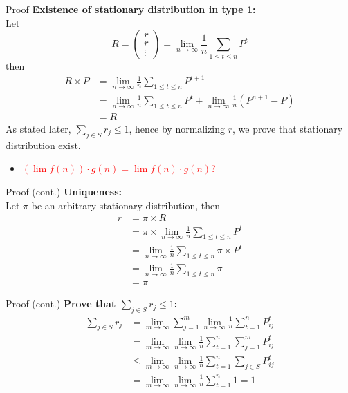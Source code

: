 \documentclass{beamer}
\begin{document}
\begin{frame}[shrink]{Proof}
	\textbf{Existence of stationary distribution in type 1:} \\
	Let 
	\[
	R = 
	\begin{pmatrix}
		r \\
		r \\
		\vdots
	\end{pmatrix} 
	= \lim_{n\to\infty} \frac{1}{n} \sum_{1 \leq t \leq n} P^t
	\]
	then
	\begin{align*}
		R \times P &= \lim_{n\to\infty} \frac{1}{n} \sum_{1 \leq t \leq n} P^{t+1} \\
		&= \lim_{n\to\infty} \frac{1}{n} \sum_{1 \leq t \leq n} P^t + \lim_{n\to\infty} \frac{1}{n}(P^{n+1} - P) \\
		&= R
	\end{align*}
	As stated later, $\sum_{j \in S} r_j \leq 1$, hence by normalizing $r$, we prove that stationary distribution exist.
	\begin{itemize}
	\item \textcolor{red}{$(\lim f(n))\cdot g(n) = \lim f(n) \cdot g(n)$?}
	\end{itemize}
\end{frame}

\begin{frame}{Proof (cont.)}
	\textbf{Uniqueness:} \\
	Let $\pi$ be an arbitrary stationary distribution, then
	\begin{align*}
	r &= \pi \times R \\
	&= \pi \times \lim_{n\to\infty} \frac{1}{n} \sum_{1 \leq t \leq n} P^t \\
	&= \lim_{n\to\infty} \frac{1}{n} \sum_{1 \leq t \leq n} \pi \times P^t \\
	&= \lim_{n\to\infty} \frac{1}{n} \sum_{1 \leq t \leq n} \pi \\
	&= \pi
	\end{align*}
\end{frame}

\begin{frame}{Proof (cont.)}\label{proportion_sum}
	\textbf{Prove that $\sum_{j \in S} r_j \leq 1$:}\\
	\begin{align*}
	\sum_{j \in S} r_j & = 
	\lim_{m\to\infty} \sum_{j=1}^m \lim_{n\to\infty} \frac{1}{n} \sum_{t=1}^n P^t_{ij} \\
	& = \lim_{m\to\infty} \lim_{n\to\infty} \frac{1}{n}\sum_{t=1}^n \sum_{j=1}^m P^t_{ij} \\
	& \leq \lim_{m\to\infty} \lim_{n\to\infty} \frac{1}{n}\sum_{t=1}^n \sum_{j\in S} P^t_{ij} \\
	& = \lim_{m\to\infty} \lim_{n\to\infty} \frac{1}{n}\sum_{t=1}^n 1 = 1
	\end{align*}
\end{frame}
\end{document}
